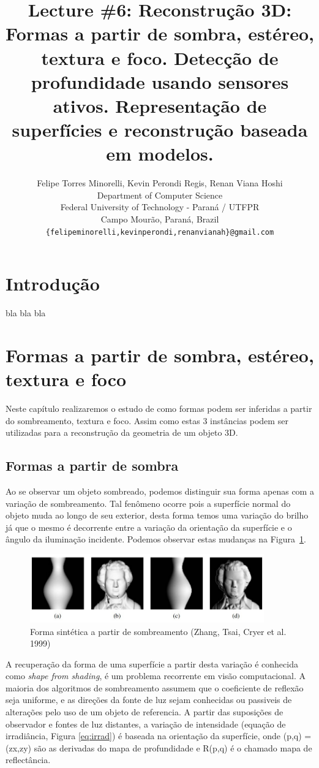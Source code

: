 \documentclass{article}
\title{Lecture \#6: Reconstrução 3D: Formas a partir de sombra, estéreo, textura e foco. Detecção de profundidade usando sensores ativos. Representação de superfícies e reconstrução baseada em modelos.}
\author{
  Felipe Torres Minorelli, Kevin Perondi Regis, Renan Viana Hoshi \\
  Department of Computer Science\\
  Federal University of Technology - Paran\'{a} / UTFPR\\
  Campo Mour\~{a}o, Paran\'{a}, Brazil \\
  \texttt{\{felipeminorelli,kevinperondi,renanvianah\}@gmail.com} \\
}
\begin{document}
\maketitle


\section{Introdução}

bla bla bla

\section{Formas a partir de sombra, estéreo, textura e foco}

Neste capítulo realizaremos o estudo de como formas podem ser inferidas a partir do sombreamento, textura e foco. Assim como estas 3 instâncias podem ser utilizadas para a reconstrução da geometria de um objeto 3D.

\subsection{Formas a partir de sombra}

Ao se observar um objeto sombreado, podemos distinguir sua forma apenas com a variação de sombreamento. Tal fenômeno ocorre pois a superfície normal do objeto muda ao longo de seu exterior, desta forma temos uma variação do brilho já que o mesmo é decorrente entre a variação da orientação da superfície e o ângulo da iluminação incidente. Podemos observar estas mudanças na Figura~\ref{fig:sombra}.

\begin{figure}[!htb]
    \centering
    \includegraphics[width=0.90\textwidth]{imagem1.jpg}
    \caption{Forma sintética a partir de sombreamento (Zhang, Tsai, Cryer et al. 1999)}
    \label{fig:sombra}
\end{figure}

A recuperação da forma de uma superfície a partir desta variação é conhecida como \textit{shape from shading}, é um problema recorrente em visão computacional.
A maioria dos algoritmos de sombreamento assumem que o coeficiente de reflexão seja uniforme, e as direções da fonte de luz sejam conhecidas ou passiveis de alterações pelo uso de um objeto de referencia. A partir das suposições de observador e fontes de luz distantes, a variação de intensidade (equação de irradiância, Figura \ref{eq:irrad}) é baseada na orientação da superfície, onde (p,q) = (zx,zy) são as derivadas do mapa de profundidade e R(p,q) é o chamado mapa de reflectância.
\end{document}
